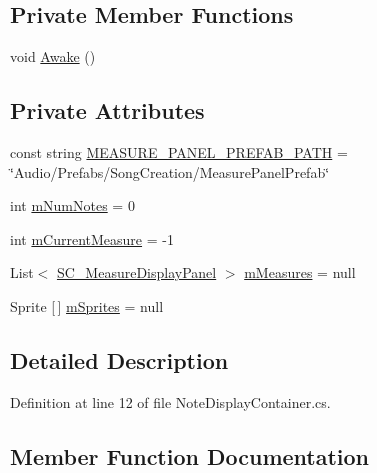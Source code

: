 \subsection*{Private Member Functions}
\begin{DoxyCompactItemize}
\item 
void \hyperlink{class_note_display_container_a17c4d7438b40d9e530f853d3ea4d8075}{Awake} ()
\end{DoxyCompactItemize}
\subsection*{Private Attributes}
\begin{DoxyCompactItemize}
\item 
const string \hyperlink{class_note_display_container_a50e30949ce455a140c4c2a317ac0406e}{M\+E\+A\+S\+U\+R\+E\+\_\+\+P\+A\+N\+E\+L\+\_\+\+P\+R\+E\+F\+A\+B\+\_\+\+P\+A\+TH} = \char`\"{}Audio/Prefabs/Song\+Creation/Measure\+Panel\+Prefab\char`\"{}
\item 
int \hyperlink{class_note_display_container_a31be4fc67033a1dcb210819e0e90d7e6}{m\+Num\+Notes} = 0
\item 
int \hyperlink{class_note_display_container_a79a97c9e0f45ba4242b66d6ec317d020}{m\+Current\+Measure} = -\/1
\item 
List$<$ \hyperlink{class_s_c___measure_display_panel}{S\+C\+\_\+\+Measure\+Display\+Panel} $>$ \hyperlink{class_note_display_container_ae5ca6e7ea4ab2baaab9ff649bf25c0d6}{m\+Measures} = null
\item 
Sprite \mbox{[}$\,$\mbox{]} \hyperlink{class_note_display_container_a2816b590b588d86780ae622b3df403ee}{m\+Sprites} = null
\end{DoxyCompactItemize}


\subsection{Detailed Description}


Definition at line 12 of file Note\+Display\+Container.\+cs.



\subsection{Member Function Documentation}
\mbox{\label{class_note_display_container_aa108ddf1c59c22600eb47b6ccc831573}} 

